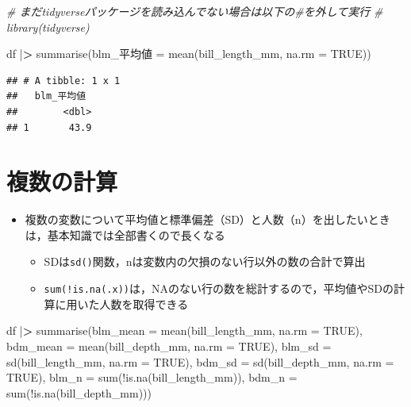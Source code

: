 \documentclass[
  xelatex,ja=standard, b5paper]{bxjsbook}
\newenvironment{Shaded}{\begin{snugshade}}{\end{snugshade}}
\newcommand{\AttributeTok}[1]{\textcolor[rgb]{0.77,0.63,0.00}{#1}}
\newcommand{\CommentTok}[1]{\textcolor[rgb]{0.56,0.35,0.01}{\textit{#1}}}
\newcommand{\ConstantTok}[1]{\textcolor[rgb]{0.00,0.00,0.00}{#1}}
\newcommand{\ErrorTok}[1]{\textcolor[rgb]{0.64,0.00,0.00}{\textbf{#1}}}
\newcommand{\FunctionTok}[1]{\textcolor[rgb]{0.00,0.00,0.00}{#1}}
\newcommand{\NormalTok}[1]{#1}
\newcommand{\OtherTok}[1]{\textcolor[rgb]{0.56,0.35,0.01}{#1}}
\newcommand{\SpecialCharTok}[1]{\textcolor[rgb]{0.00,0.00,0.00}{#1}}
\providecommand{\tightlist}{%
  \setlength{\itemsep}{0pt}\setlength{\parskip}{0pt}}
\begin{document}
\begin{Shaded}
\begin{Highlighting}[]
\CommentTok{\# まだtidyverseパッケージを読み込んでない場合は以下の\#を外して実行}
\CommentTok{\# library(tidyverse)}

\NormalTok{df }\SpecialCharTok{|}\ErrorTok{\textgreater{}} 
  \FunctionTok{summarise}\NormalTok{(blm\_平均値 }\OtherTok{=} \FunctionTok{mean}\NormalTok{(bill\_length\_mm, }\AttributeTok{na.rm =} \ConstantTok{TRUE}\NormalTok{))}
\end{Highlighting}
\end{Shaded}

\begin{verbatim}
## # A tibble: 1 x 1
##   blm_平均値
##        <dbl>
## 1       43.9
\end{verbatim}

\hypertarget{su-st-multiple}{%
\section{複数の計算}\label{su-st-multiple}}

\begin{itemize}
\tightlist
\item
  複数の変数について平均値と標準偏差（SD）と人数（n）を出したいときは，基本知識では全部書くので長くなる

  \begin{itemize}
  \tightlist
  \item
    SDは\texttt{sd()}関数，nは変数内の欠損のない行以外の数の合計で算出
  \item
    \texttt{sum(!is.na(.x))}は，NAのない行の数を総計するので，平均値やSDの計算に用いた人数を取得できる
  \end{itemize}
\end{itemize}

\begin{Shaded}
\begin{Highlighting}[]
\NormalTok{df }\SpecialCharTok{|}\ErrorTok{\textgreater{}} 
  \FunctionTok{summarise}\NormalTok{(}\AttributeTok{blm\_mean =} \FunctionTok{mean}\NormalTok{(bill\_length\_mm, }\AttributeTok{na.rm =} \ConstantTok{TRUE}\NormalTok{),}
            \AttributeTok{bdm\_mean =} \FunctionTok{mean}\NormalTok{(bill\_depth\_mm, }\AttributeTok{na.rm =} \ConstantTok{TRUE}\NormalTok{),}
            \AttributeTok{blm\_sd =} \FunctionTok{sd}\NormalTok{(bill\_length\_mm, }\AttributeTok{na.rm =} \ConstantTok{TRUE}\NormalTok{),}
            \AttributeTok{bdm\_sd =} \FunctionTok{sd}\NormalTok{(bill\_depth\_mm, }\AttributeTok{na.rm =} \ConstantTok{TRUE}\NormalTok{),}
            \AttributeTok{blm\_n  =} \FunctionTok{sum}\NormalTok{(}\SpecialCharTok{!}\FunctionTok{is.na}\NormalTok{(bill\_length\_mm)),}
            \AttributeTok{bdm\_n  =} \FunctionTok{sum}\NormalTok{(}\SpecialCharTok{!}\FunctionTok{is.na}\NormalTok{(bill\_depth\_mm)))}
\end{Highlighting}
\end{Shaded}
\end{document}
